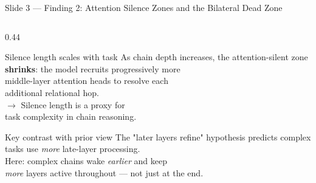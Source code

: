 \documentclass[aspectratio=169,10pt]{beamer}
\begin{document}
\begin{frame}{Slide 3 — Finding 2: Attention Silence Zones and the Bilateral Dead Zone}
\begin{columns}[T]
\begin{column}{0.44\textwidth}
\vspace{4pt}
\begin{block}{Silence length scales with task}
\footnotesize
As chain depth increases, the attention-silent zone\\
\textbf{shrinks}: the model recruits progressively more\\
middle-layer attention heads to resolve each\\
additional relational hop.\\[6pt]
$\rightarrow$ Silence length is a proxy for\\
\quad task complexity in chain reasoning.
\end{block}

\vspace{4pt}
\begin{alertblock}{\footnotesize Key contrast with prior view}
\footnotesize
The "later layers refine" hypothesis predicts complex\\
tasks use \emph{more} late-layer processing.\\
Here: complex chains wake \emph{earlier} and keep\\
\emph{more} layers active throughout — not just at the end.
\end{alertblock}
\end{column}

\end{columns}
\end{frame}
\end{document}

